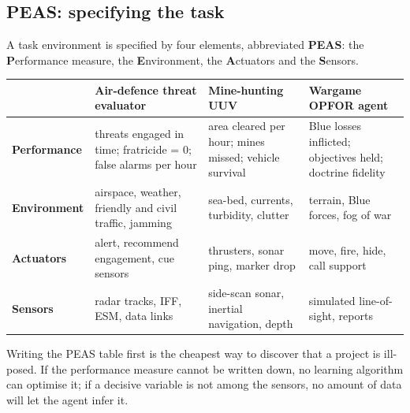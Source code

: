\documentclass[11pt]{article}
\begin{document}
\subsection{PEAS: specifying the task}
A task environment is specified by four elements, abbreviated \textbf{PEAS}: the \textbf{P}erformance measure, the \textbf{E}nvironment, the \textbf{A}ctuators and the \textbf{S}ensors.
\begin{center}\small\renewcommand{\arraystretch}{1.3}
\begin{tabularx}{\textwidth}{>{\bfseries}p{2.3cm}XXX}\toprule
 & Air-defence threat evaluator & Mine-hunting UUV & Wargame OPFOR agent\\\midrule
Performance & threats engaged in time; fratricide = 0; false alarms per hour & area cleared per hour; mines missed; vehicle survival & Blue losses inflicted; objectives held; doctrine fidelity\\
Environment & airspace, weather, friendly and civil traffic, jamming & sea-bed, currents, turbidity, clutter & terrain, Blue forces, fog of war\\
Actuators & alert, recommend engagement, cue sensors & thrusters, sonar ping, marker drop & move, fire, hide, call support\\
Sensors & radar tracks, IFF, ESM, data links & side-scan sonar, inertial navigation, depth & simulated line-of-sight, reports\\\bottomrule
\end{tabularx}\end{center}
Writing the PEAS table first is the cheapest way to discover that a project is ill-posed. If the performance measure cannot be written down, no learning algorithm can optimise it; if a decisive variable is not among the sensors, no amount of data will let the agent infer it.
\end{document}

